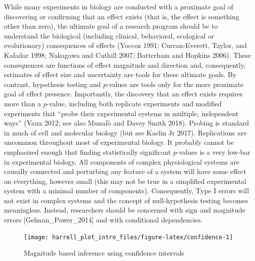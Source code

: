 \documentclass[fleqn,10pt,lineno]{wlpeerj} %
\theoremstyle{definition}
\theoremstyle{definition}
\theoremstyle{definition}
\theoremstyle{remark}
\begin{document}
While many experiments in biology are conducted with a proximate goal of
discovering or confirming that an effect exists (that is, the effect is
something other than zero), the ultimate goal of a research program
should be to understand the biological (including clinical, behavioral,
ecological or evolutionary) consequences of effects (Yoccoz 1991;
Curran-Everett, Taylor, and Kafadar 1998; Nakagawa and Cuthill 2007;
Batterham and Hopkins 2006). These consequences are functions of effect
magnitude and direction and, consequently, estimates of effect size and
uncertainty are tools for these ultimate goals. By contrast, hypothesis
testing and \(p\)-values are tools only for the more proximate goal of
effect presence. Importantly, the discovery that an effect exists
requires more than a \(p\)-value, including both replicate experiments
and modified experiments that ``probe their experimental systems in
multiple, independent ways'' (Vaux 2012; see also Munafò and Davey Smith
2018). Probing is standard in much of cell and molecular biology (but
see Kaelin Jr 2017). Replications are uncommon throughout most of
experimental biology. It probably cannot be emphasized enough that
finding statistically significant \(p\)-values is a very low-bar in
experimental biology. All components of complex physiological systems
are causally connected and perturbing any feature of a system will have
some effect on everything, however small (this may not be true in a
simplified experimental system with a minimal number of components).
Consequently, Type I errors will not exist in complex systems and the
concept of null-hypothesis testing becomes meaningless. Instead,
researchers should be concerned with sign and magnitude errors
{[}Gelman\_Power\_2014{]} and with conditional dependencies.

\begin{figure}
\texttt{[image: harrell\_plot\_intro\_files/figure-latex/confidence-1]} \caption{Magnitude based inference using confidence intervals}\label{fig:confidence}
\end{figure}
\end{document}
